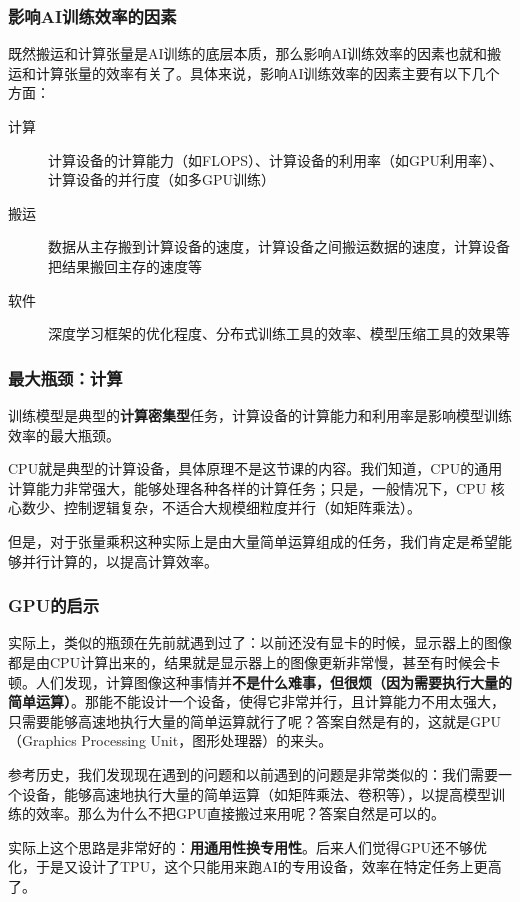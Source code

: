 \documentclass{ctexbeamer}
\begin{document}
\begin{frame}
    \frametitle{影响AI训练效率的因素}

    既然搬运和计算张量是AI训练的底层本质，那么影响AI训练效率的因素也就和搬运和计算张量的效率有关了。具体来说，影响AI训练效率的因素主要有以下几个方面：
    \begin{description}
        \item[计算] 计算设备的计算能力（如FLOPS）、计算设备的利用率（如GPU利用率）、计算设备的并行度（如多GPU训练）
        \item[搬运] 数据从主存搬到计算设备的速度，计算设备之间搬运数据的速度，计算设备把结果搬回主存的速度等
        \item[软件] 深度学习框架的优化程度、分布式训练工具的效率、模型压缩工具的效果等
    \end{description}    

\end{frame}

\begin{frame}
    \frametitle{最大瓶颈：计算}

    训练模型是典型的\textbf{计算密集型}任务，计算设备的计算能力和利用率是影响模型训练效率的最大瓶颈。

    CPU就是典型的计算设备，具体原理不是这节课的内容。我们知道，CPU的通用计算能力非常强大，能够处理各种各样的计算任务；只是，一般情况下，CPU 核心数少、控制逻辑复杂，不适合大规模细粒度并行（如矩阵乘法）。
    
    但是，对于张量乘积这种实际上是由大量简单运算组成的任务，我们肯定是希望能够并行计算的，以提高计算效率。

\end{frame}

\begin{frame}
    \frametitle{GPU的启示}

    实际上，类似的瓶颈在先前就遇到过了：以前还没有显卡的时候，显示器上的图像都是由CPU计算出来的，结果就是显示器上的图像更新非常慢，甚至有时候会卡顿。人们发现，计算图像这种事情并\textbf{不是什么难事，但很烦（因为需要执行大量的简单运算）}。那能不能设计一个设备，使得它非常并行，且计算能力不用太强大，只需要能够高速地执行大量的简单运算就行了呢？答案自然是有的，这就是GPU（Graphics Processing Unit，图形处理器）的来头。

    参考历史，我们发现现在遇到的问题和以前遇到的问题是非常类似的：我们需要一个设备，能够高速地执行大量的简单运算（如矩阵乘法、卷积等），以提高模型训练的效率。那么为什么不把GPU直接搬过来用呢？答案自然是可以的。

    实际上这个思路是非常好的：\textbf{用通用性换专用性}。后来人们觉得GPU还不够优化，于是又设计了TPU，这个只能用来跑AI的专用设备，效率在特定任务上更高了。

\end{frame}
\end{document}

